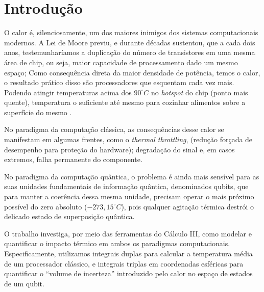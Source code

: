 
\section{Introdução}
O calor é, silenciosamente, um dos maiores inimigos dos sistemas computacionais modernos. A Lei de Moore\cite{moore} previu, e durante décadas sustentou, que a cada dois anos, testemunharíamos a duplicação do número de transistores em uma mesma área de chip, ou seja, maior capacidade de processamento dado um mesmo espaço; Como consequência direta da maior densidade de potência, temos o calor, o resultado prático disso são processadores que esquentam cada vez mais. Podendo atingir temperaturas acima dos $90^{\circ}C$ no \textit{hotspot} do chip (ponto mais quente), temperatura o suficiente até mesmo para cozinhar alimentos sobre a superfície do mesmo \cite{cpucook}.

No paradigma da computação clássica, as consequências desse calor se manifestam em algumas frentes, como o \textit{thermal throttling}, (redução forçada de desempenho para proteção do hardware); degradação do sinal e, em casos extremos, falha permanente do componente. 

No paradigma da computação quântica, o problema é ainda mais sensível para as suas  unidades fundamentais de informação quântica\cite{quantum}, denominados qubits\cite{quantuminfo}, que para manter a coerência dessa mesma unidade, precisam operar o mais próximo possível do zero absoluto ($-273,15^{\circ}C$), pois qualquer agitação térmica destrói o delicado estado de superposição quântica.

O trabalho investiga, por meio das ferramentas do Cálculo III\cite{calc-vol2}, como modelar e quantificar o impacto térmico em ambos os paradigmas computacionais. Especificamente, utilizamos integrais duplas para calcular a temperatura média de um processador clássico, e integrais triplas em coordenadas esféricas para quantificar o ``volume de incerteza'' introduzido pelo calor no espaço de estados de um qubit.
